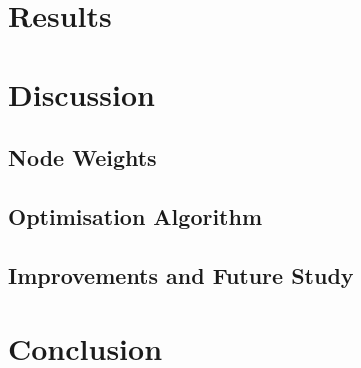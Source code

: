 \documentclass[a4paper,11pt,notitlepage]{article}
\begin{document}
\newpage
\section{Results}


\newpage
\section{Discussion}


\subsection{Node Weights}
\subsection{Optimisation Algorithm}

\subsection{Improvements and Future Study}


\newpage
\section{Conclusion}


\newpage



\end{document}
